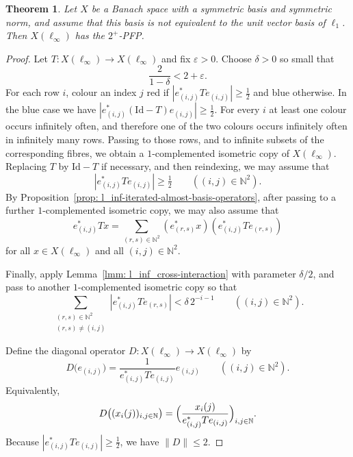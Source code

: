 \documentclass[11pt]{amsart}
\theoremstyle{plain}
\newtheorem{theorem}{Theorem}[section]
\theoremstyle{definition}
\numberwithin{equation}{section}
\newcommand{\norm}[1]{\lVert #1 \rVert}
\newcommand{\N}{\mathbb{N}}
\newcommand{\Id}{\mathrm{Id}}
\renewcommand{\le}{\leqslant}
\renewcommand{\ge}{\geqslant}
\begin{document}
\begin{theorem}\label{th: l_inf-iterated}
    Let $X$ be a Banach space with a symmetric basis and symmetric norm, and assume that this basis is not equivalent to the unit vector basis of $\ell_1$. Then $X(\ell_\infty)$ has the $2^+$-PFP.
\end{theorem}
\begin{proof}
    Let $T\colon X(\ell_\infty)\to X(\ell_\infty)$ and fix $\varepsilon>0$.
    Choose $\delta>0$ so small that
    \[
    \frac{2}{1-\delta}<2+\varepsilon.
    \]
    For each row $i$, colour an index $j$ red if
    $|e_{(i,j)}^*Te_{(i,j)}|\ge \tfrac12$ and blue otherwise.  In the blue case we have
    $|e_{(i,j)}^*(\Id-T)e_{(i,j)}|\ge \tfrac12$.  For every $i$ at least one colour occurs infinitely often, and therefore one of the two colours occurs infinitely often in infinitely many rows.  Passing to those rows, and to infinite subsets of the corresponding fibres, we obtain a $1$-complemented isometric copy of $X(\ell_\infty)$.  Replacing $T$ by $\Id-T$ if necessary, and then reindexing, we may assume that
    \[
        |e_{(i,j)}^*Te_{(i,j)}|\ge \tfrac12
        \qquad ((i,j)\in\N^2).
    \]
    By Proposition~\ref{prop: l_inf-iterated-almost-basis-operators}, after passing to a further $1$-complemented isometric copy, we may also assume that
    \begin{equation}\label{eq: l_infinite-iterated-1-patch}
        e^*_{(i,j)}Tx
        = \sum_{(r,s)\in\N^2}(e^*_{(r,s)}x)(e^*_{(i,j)}Te_{(r,s)})
    \end{equation}
    for all $x\in X(\ell_\infty)$ and all $(i,j)\in\N^2$.
    
    Finally, apply Lemma~\ref{lmm: l_inf_cross-interaction} with parameter
    $\delta/2$, and pass to another $1$-complemented isometric copy so that
    \begin{equation}\label{eq: l_infinite-iterated-2-patch}
    \sum_{\substack{(r,s)\in\N^2\\(r,s)\neq(i,j)}}
    |e^*_{(i,j)}Te_{(r,s)}|
    < \delta\,2^{-i-1}
    \qquad((i,j)\in\N^2).
    \end{equation}
    
    Define the diagonal operator $D\colon X(\ell_\infty)\to X(\ell_\infty)$ by
    \[
    D\bigl(e_{(i,j)}\bigr)=\frac{1}{e^*_{(i,j)}Te_{(i,j)}}e_{(i,j)}
    \qquad((i,j)\in\N^2).
    \]
    Equivalently,
    \[
    D\bigl((x_i(j))_{i,j\in\N}\bigr)
    =\Bigl(\frac{x_i(j)}{e^*_{(i,j)}Te_{(i,j)}}\Bigr)_{i,j\in\N}.
    \]
    Because $|e^*_{(i,j)}Te_{(i,j)}|\ge \tfrac12$, we have $\norm{D}\le 2$.
    

\end{proof}
\end{document}
